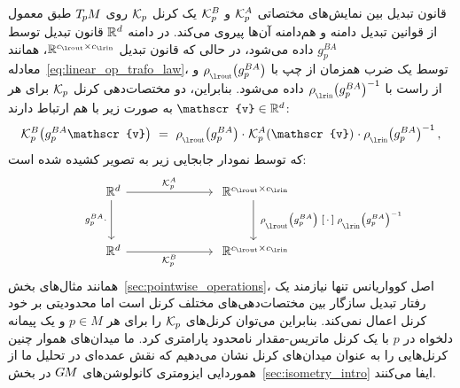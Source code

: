 قانون تبدیل بین نمایش‌های مختصاتی $\mathcal{K}_p^A$ و $\mathcal{K}_p^B$ یک کرنل $\mathcal{K}_p$ روی $T_{\mkern-1.5mu p}\mkern-.5muM$ طبق معمول از قوانین تبدیل دامنه و هم‌دامنه آن‌ها پیروی می‌کند.
در دامنه $\mathbb{R}^d$ قانون تبدیل توسط $g_p^{BA}$ داده می‌شود، در حالی که قانون تبدیل $\R^{\cout\times\cin}$، همانند معادله~\eqref{eq:linear_op_trafo_law}، توسط یک ضرب همزمان از چپ با $\rhoout\big(g_p^{BA}\big)$ و از راست با $\rhoin\big(g_p^{BA}\big)^{-1}$ داده می‌شود.
بنابراین، دو مختصات‌دهی کرنل $\mathcal{K}_p$ برای هر $\mathscr{v} \in \R^d$ به صورت زیر با هم ارتباط دارند:
\begin{align}\label{eq:kernel_trafo_law}
	\Kp^B\big(g_p^{BA} \mathscr{v}\big)\ =\ 
	\rhoout\big(g_p^{BA}\big) \cdot\mkern1mu 
	\Kp^A (\mathscr{v})
	\mkern1mu\cdot \rhoin\big(g_p^{BA}\big)^{-1} \,,
\end{align}
که توسط نمودار جابجایی زیر به تصویر کشیده شده است:
\begin{equation}\label{cd:kernel_trafo_law}
	\qquad
	\begin{tikzcd}[column sep=70pt, row sep=32pt, font=\normalsize]
		\R^d
		\arrow[d, "g_p^{BA} \cdot\,"']
		\arrow[r, "\Kp^A"]
		&
		\R^{\cout\times\cin}
		\arrow[d, "\ \rhoout\big(g_p^{BA}\big) \; \scalebox{1.1}{$[\,\cdot\,]$} \; \rhoin\big(g_p^{BA}\big)^{-1}"]
		\\
		\R^d
		\arrow[r, "\Kp^B"']
		&
		\R^{\cout\times\cin}
	\end{tikzcd}
\end{equation}
همانند مثال‌های بخش~\ref{sec:pointwise_operations}، اصل کوواریانس تنها نیازمند یک رفتار تبدیل سازگار بین مختصات‌دهی‌های مختلف کرنل است اما محدودیتی بر خود کرنل اعمال نمی‌کند.
بنابراین می‌توان کرنل‌های $\mathcal{K}_p$ را برای هر $p\in M$ و یک پیمانه دلخواه در $p$ با یک کرنل ماتریس-مقدار نامحدود پارامتری کرد.
ما میدان‌های هموار چنین کرنل‌هایی را به عنوان میدان‌های کرنل نشان می‌دهیم که نقش عمده‌ای در تحلیل ما از هموردایی ایزومتری کانولوشن‌های $G\mkern-1.4muM$ در بخش~\ref{sec:isometry_intro} ایفا می‌کنند.

